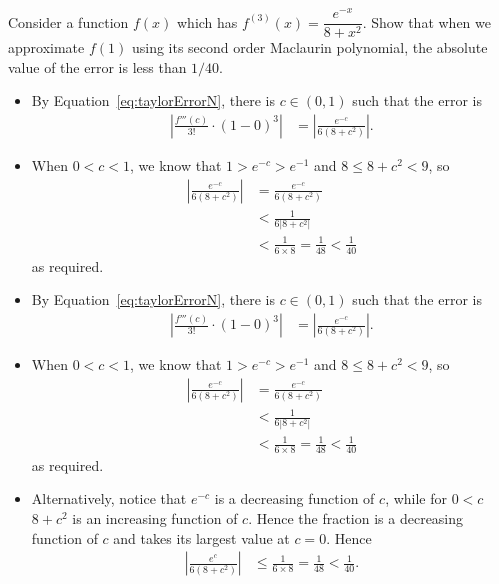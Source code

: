 \begin{Mquestion}[2015Q]
Consider a function $f(x)$ which has $f^{(3)}(x)=\dfrac{e^{-x}}{8+x^2}$.  Show
that when we approximate $f(1)$ using its second order Maclaurin polynomial, the
absolute value of the error is less than $1/40$.
\end{Mquestion}
\begin{answer}
\begin{itemize}
\item By Equation~\ref*{eq:taylorErrorN}, there is $c\in(0,1)$ such
that the error is
\begin{align*}
\left|\frac{f'''(c)}{3!}\cdot (1-0)^3\right|
&=  \left|\frac{e^{-c}}{6(8+c^2)}\right|.
\end{align*}

\item When $0< c<1$, we know that $1> e^{-c} > e^{-1}$ and
$8 \leq 8+c^2 < 9$, so
\begin{align*}
\left|\frac{e^{-c}}{6(8+c^2)}\right|
  &=\frac{e^{-c}}{6(8+c^2)} \\
  & < \frac{1}{6 |8+c^2|} \\
  & < \frac{1}{6\times 8} = \frac{1}{48} < \frac{1}{40}
\end{align*}
as required.
\end{itemize}
\end{answer}
\begin{solution}
\begin{itemize}
\item By Equation~\ref*{eq:taylorErrorN}, there is $c\in(0,1)$ such
that the error is
\begin{align*}
\left|\frac{f'''(c)}{3!}\cdot (1-0)^3\right|
&=  \left|\frac{e^{-c}}{6(8+c^2)}\right|.
\end{align*}

\item When $0< c<1$, we know that $1> e^{-c} > e^{-1}$ and
$8 \leq 8+c^2 < 9$, so
\begin{align*}
\left|\frac{e^{-c}}{6(8+c^2)}\right|
  &=\frac{e^{-c}}{6(8+c^2)} \\
  & < \frac{1}{6 |8+c^2|} \\
  & < \frac{1}{6\times 8} = \frac{1}{48} < \frac{1}{40}
\end{align*}
as required.

\item Alternatively, notice that $e^{-c}$ is a decreasing function of
$c$, while for $0<c$ $8+c^2$ is an increasing function of $c$. Hence the fraction is a
decreasing function of $c$ and takes its largest value at $c=0$. Hence
\begin{align*}
\left|\frac{e^c}{6(8+c^2)}\right|
& \leq \frac{1}{6\times 8} = \frac{1}{48} < \frac{1}{40}.
\end{align*}
\end{itemize}
\end{solution}



